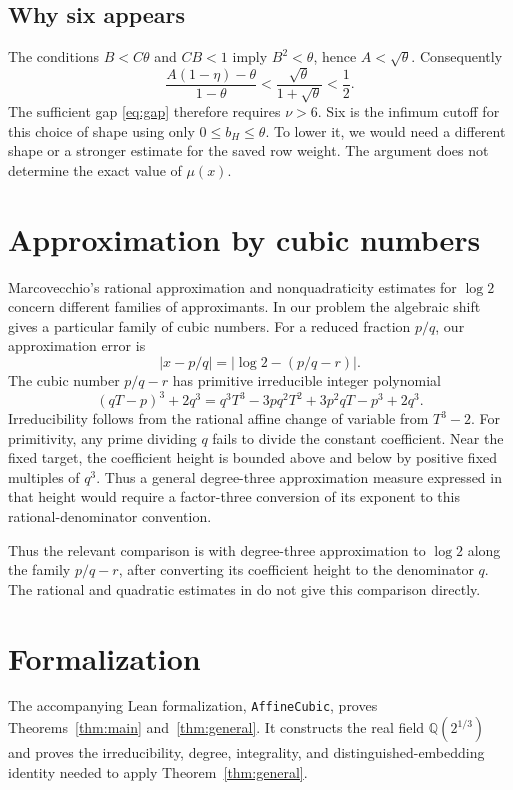 \documentclass[11pt]{article}
\newcommand{\Q}{\mathbb Q}
\theoremstyle{remark}
\begin{document}
\subsection{Why six appears}
The conditions $B<C\theta$ and $CB<1$ imply $B^2<\theta$, hence
$A<\sqrt\theta$. Consequently
\[
 \frac{A(1-\eta)-\theta}{1-\theta}
 <\frac{\sqrt\theta}{1+\sqrt\theta}<\frac12.
\]
The sufficient gap \eqref{eq:gap} therefore requires $\nu>6$.
Six is the infimum cutoff for this choice of shape using only
$0\le b_H\le\theta$. To lower it, we would need a different shape
or a stronger estimate for the saved row weight. The argument does
not determine the exact value of $\mu(x)$.

\section{Approximation by cubic numbers}\label{sec:context}
Marcovecchio's rational approximation and nonquadraticity estimates
for $\log2$ \cite{marcovecchio} concern different families of
approximants. In our problem the algebraic shift gives a particular
family of cubic numbers.
For a reduced fraction $p/q$, our approximation error is
\[
 |x-p/q|=|\log2-(p/q-r)|.
\]
The cubic number $p/q-r$ has primitive irreducible integer polynomial
\[
 (qT-p)^3+2q^3
 =q^3T^3-3pq^2T^2+3p^2qT-p^3+2q^3.
\]
Irreducibility follows from the rational affine change of variable
from $T^3-2$. For primitivity, any prime dividing $q$ fails to divide
the constant coefficient. Near the fixed target, the coefficient
height is bounded above and below by positive fixed multiples of
$q^3$. Thus a general degree-three approximation measure expressed in
that height would require a factor-three conversion of its exponent
to this rational-denominator convention.

Thus the relevant comparison is with degree-three approximation to
$\log2$ along the family $p/q-r$, after converting its coefficient
height to the denominator $q$. The rational and quadratic estimates
in \cite{marcovecchio} do not give this comparison directly.

\appendix
\section{Formalization}
The accompanying Lean formalization, \texttt{AffineCubic}, proves
Theorems~\ref{thm:main} and~\ref{thm:general}. It constructs the real
field $\Q(2^{1/3})$ and proves the irreducibility, degree, integrality,
and distinguished-embedding identity needed to apply
Theorem~\ref{thm:general}.
\end{document}
